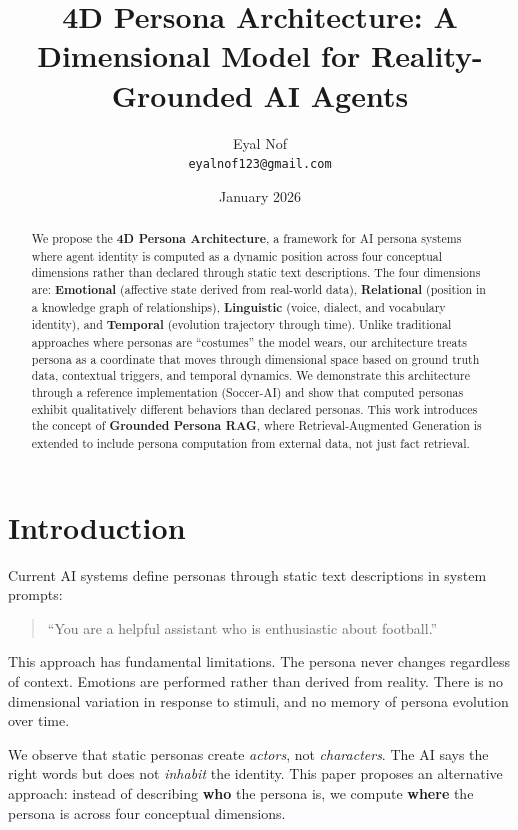 \documentclass[11pt]{article}
\title{4D Persona Architecture: A Dimensional Model for Reality-Grounded AI Agents}
\author{
  Eyal Nof\\
  \texttt{eyalnof123@gmail.com}
}
\date{January 2026}
\begin{document}
\maketitle

\begin{abstract}
We propose the \textbf{4D Persona Architecture}, a framework for AI persona systems where agent identity is computed as a dynamic position across four conceptual dimensions rather than declared through static text descriptions. The four dimensions are: \textbf{Emotional} (affective state derived from real-world data), \textbf{Relational} (position in a knowledge graph of relationships), \textbf{Linguistic} (voice, dialect, and vocabulary identity), and \textbf{Temporal} (evolution trajectory through time). Unlike traditional approaches where personas are ``costumes'' the model wears, our architecture treats persona as a coordinate that moves through dimensional space based on ground truth data, contextual triggers, and temporal dynamics. We demonstrate this architecture through a reference implementation (Soccer-AI) and show that computed personas exhibit qualitatively different behaviors than declared personas. This work introduces the concept of \textbf{Grounded Persona RAG}, where Retrieval-Augmented Generation is extended to include persona computation from external data, not just fact retrieval.
\end{abstract}

\section{Introduction}

Current AI systems define personas through static text descriptions in system prompts:

\begin{quote}
``You are a helpful assistant who is enthusiastic about football.''
\end{quote}

This approach has fundamental limitations. The persona never changes regardless of context. Emotions are performed rather than derived from reality. There is no dimensional variation in response to stimuli, and no memory of persona evolution over time.

We observe that static personas create \textit{actors}, not \textit{characters}. The AI says the right words but does not \textit{inhabit} the identity. This paper proposes an alternative approach: instead of describing \textbf{who} the persona is, we compute \textbf{where} the persona is across four conceptual dimensions.
\end{document}
